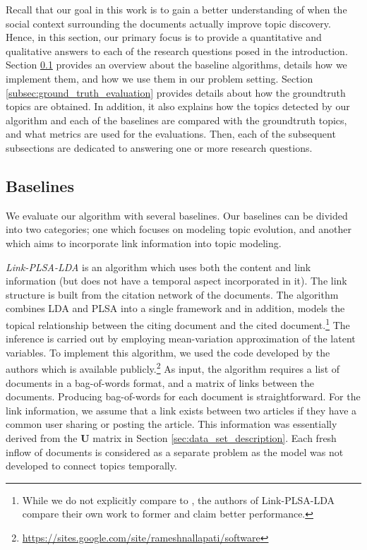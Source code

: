 Recall that our goal in this work is to gain a better understanding of when the
social context surrounding the documents actually improve topic discovery.
Hence, in this section, our primary focus is to provide a quantitative and 
qualitative answers to each of the research questions posed in the introduction. 
Section \ref{subsec:baselines} provides an overview about the baseline algorithms,
details how we implement them, and how we use them in our
problem setting.  Section \ref{subsec:ground_truth_evaluation}
provides details about how the groundtruth topics are obtained.  In addition,
it also explains how the topics detected by our algorithm and each of the baselines are compared with
the groundtruth  topics, and what metrics are used for the evaluations.
Then, each of the subsequent subsections are dedicated to answering one or more 
research questions.
\subsection{Baselines}
\label{subsec:baselines}
We evaluate our algorithm with several baselines.  Our baselines can be divided into two categories;
one which focuses on modeling topic evolution, and another which aims to incorporate link information
into topic modeling.

\emph{Link-PLSA-LDA} \cite{Nallapati:2008} is an algorithm which uses both the content
and link information (but does not have a temporal aspect incorporated in it). 
The link structure is built from the citation network of the documents.
The algorithm combines LDA and PLSA into a single
framework and in addition, models the topical relationship between the citing document
and the cited document.\footnote{While we do not explicitly compare to \cite{Erosheva:2004}, the
authors of Link-PLSA-LDA compare
their own work to former and claim better performance.}  The inference is carried out by
employing mean-variation approximation of the latent variables.  To implement this algorithm, 
we used the code developed by the authors which is available publicly.\footnote{\hyperref[]{https://sites.google.com/site/rameshnallapati/software}}  As input, the algorithm requires
a list of documents in a bag-of-words format, and a matrix of links between the documents.  Producing
bag-of-words for each document is straightforward.  For the link information, 
we assume that a link exists between two articles if they have a common user sharing or posting
the article.  This information was essentially derived from the $\mathbf{U}$ matrix in Section
\ref{sec:data_set_description}.  Each fresh inflow of documents is considered as a separate problem
as the model was not developed to connect topics temporally.

